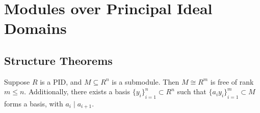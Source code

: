 
\section{Modules over Principal Ideal Domains}

\subsection*{Structure Theorems}

\begin{theorem}\label{thm:pid-submodule-free}
    Suppose \(R\) is a PID,
    and \(M \subseteq R^n\) is a submodule.
    Then \(M \cong R^m\) is free of rank \(m \leq n\).
    Additionally, there exists a basis \({\{y_i\}}_{i=1}^n \subset R^n\)
    such that \({\{a_i y_i\}}_{i=1}^m \subset M\) forms a basis,
    with \(a_i \mid a_{i+1}\).
\end{theorem}

